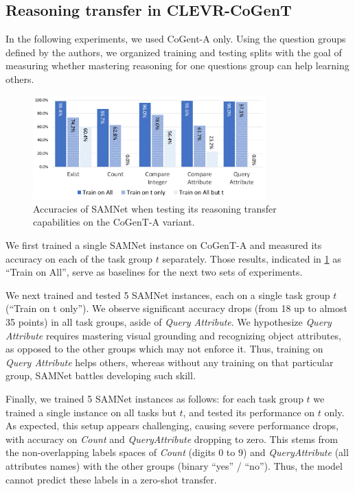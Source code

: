 \subsection{Reasoning transfer in CLEVR-CoGenT}
\label{sec:reasoning-transfer-clevr}
In the following experiments, we used CoGent-A only.
Using the question groups defined by the authors, we organized training and testing splits with the goal of measuring whether mastering reasoning for one questions group can help learning others.

\begin{figure}[htbp]
	\centering
	\includegraphics[width=0.8\textwidth]{figures/cogent_reasoning_transfer.pdf}
	\caption{Accuracies of SAMNet when testing its reasoning transfer capabilities on the CoGenT-A variant.}
	\label{fig:cogent_reasoning_transfer}
\end{figure}

We first trained a single SAMNet instance on CoGenT-A and measured its accuracy on each of the task group $t$ separately.
Those results, indicated in \cref{fig:cogent_reasoning_transfer} as ``Train on All'', serve as baselines for the next two sets of experiments.

We next trained and tested 5 SAMNet instances, each on a single task group $t$ (``Train on t only'').
We observe significant accuracy drops (from 18 up to almost 35 points) in all task groups, aside of \textit{Query Attribute}.
We hypothesize \textit{Query Attribute} requires mastering visual grounding and recognizing object attributes, as opposed to the other groups which may not enforce it.
Thus, training on \textit{Query Attribute} helps others, whereas without any training on that particular group, SAMNet battles developing such skill.

Finally, we trained 5 SAMNet instances as follows: for each task group $t$ we trained a single instance on all tasks but $t$, and tested its performance on $t$ only.
As expected, this setup appears challenging, causing severe performance drops, with accuracy on \textit{Count} and \textit{QueryAttribute} dropping to zero.
This stems from the non-overlapping labels spaces of \textit{Count} (digits 0 to 9) and \textit{QueryAttribute} (all attributes names) with the other groups (binary ``yes'' / ``no''). Thus, the model cannot predict these labels in a zero-shot transfer.


